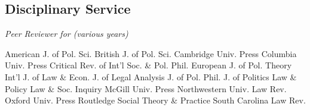 \documentclass[letterpaper]{moderncv}
\begin{document}
\subsection{Disciplinary Service}
\hspace{1cm} \textit{Peer Reviewer for (various years)}
\begin{multicols}{2}

  \hspace*{1cm}
  American J. of Pol. Sci.
  \newline
  \hspace*{1cm}
  British J. of Pol. Sci.
  \newline
  \hspace*{1cm}
  Cambridge Univ. Press
  \newline
  \hspace*{1cm}
  Columbia Univ. Press
  \newline
  \hspace*{1cm}
  Critical Rev. of Int'l Soc. \& Pol. Phil.
  \newline
  \hspace*{1cm}
  European J. of Pol. Theory
  \newline
  \hspace*{1cm}
  Int'l J. of Law \& Econ.
  \newline
  \hspace*{1cm}
  J. of Legal Analysis
  \newline
  \hspace*{1cm}
  J. of Pol. Phil.
  \newline
  \hspace*{1cm}
  J. of Politics
  \newline
  \hspace*{1cm}
  Law \& Policy
  \newline
  \hspace*{1cm}
  Law \& Soc. Inquiry
  \newline
  \hspace*{1cm}
  McGill Univ. Press
  \newline
  \hspace*{1cm}
  Northwestern Univ. Law Rev.
  \newline
  \hspace*{1cm}
  Oxford Univ. Press
  \newline
  \hspace*{1cm}
  Routledge
  \newline
  \hspace*{1cm}
  Social Theory \& Practice
  \newline
  \hspace*{1cm}
  South Carolina Law Rev.
  \newline
\end{multicols}
\vspace{1mm}
\end{document}
